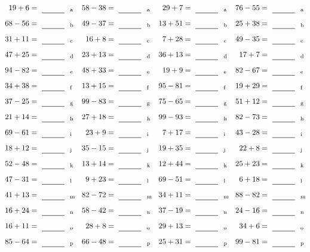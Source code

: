 \documentclass
[
  draft    = true,
  fontsize = 11pt,
  parskip  = half-
]
{scrartcl}
\begin{document}
\clearpage
\begin{align*}
    \pline{19+6}&=\rline{a}
  & \pline{58-38}&=\rline{a}
  & \pline{29+7}&=\rline{a}
  & \pline{76-55}&=\rline{a} \\[1ex]
    \pline{68-56}&=\rline{b}
  & \pline{49-37}&=\rline{b}
  & \pline{13+51}&=\rline{b}
  & \pline{25+38}&=\rline{b} \\[1ex]
    \pline{31+11}&=\rline{c}
  & \pline{16+8}&=\rline{c}
  & \pline{7+28}&=\rline{c}
  & \pline{49-35}&=\rline{c} \\[1ex]
    \pline{47+25}&=\rline{d}
  & \pline{23+13}&=\rline{d}
  & \pline{36+13}&=\rline{d}
  & \pline{17+7}&=\rline{d} \\[1ex]
    \pline{94-82}&=\rline{e}
  & \pline{48+33}&=\rline{e}
  & \pline{19+9}&=\rline{e}
  & \pline{82-67}&=\rline{e} \\[1ex]
    \pline{34+38}&=\rline{f}
  & \pline{13+15}&=\rline{f}
  & \pline{95-81}&=\rline{f}
  & \pline{19+29}&=\rline{f} \\[1ex]
    \pline{37-25}&=\rline{g}
  & \pline{99-83}&=\rline{g}
  & \pline{75-65}&=\rline{g}
  & \pline{51+12}&=\rline{g} \\[1ex]
    \pline{21+14}&=\rline{h}
  & \pline{27+18}&=\rline{h}
  & \pline{99-93}&=\rline{h}
  & \pline{82-73}&=\rline{h} \\[1ex]
    \pline{69-61}&=\rline{i}
  & \pline{23+9}&=\rline{i}
  & \pline{7+17}&=\rline{i}
  & \pline{43-28}&=\rline{i} \\[1ex]
    \pline{18+12}&=\rline{j}
  & \pline{35-15}&=\rline{j}
  & \pline{19+35}&=\rline{j}
  & \pline{22+8}&=\rline{j} \\[1ex]
    \pline{52-48}&=\rline{k}
  & \pline{13+14}&=\rline{k}
  & \pline{12+44}&=\rline{k}
  & \pline{25+23}&=\rline{k} \\[1ex]
    \pline{47-31}&=\rline{l}
  & \pline{9+23}&=\rline{l}
  & \pline{69-51}&=\rline{l}
  & \pline{6+18}&=\rline{l} \\[1ex]
    \pline{41+13}&=\rline{m}
  & \pline{82-72}&=\rline{m}
  & \pline{34+11}&=\rline{m}
  & \pline{88-82}&=\rline{m} \\[1ex]
    \pline{16+24}&=\rline{n}
  & \pline{58-42}&=\rline{n}
  & \pline{37-19}&=\rline{n}
  & \pline{24-16}&=\rline{n} \\[1ex]
    \pline{16+11}&=\rline{o}
  & \pline{28+8}&=\rline{o}
  & \pline{29+13}&=\rline{o}
  & \pline{34+6}&=\rline{o} \\[1ex]
    \pline{85-64}&=\rline{p}
  & \pline{66-48}&=\rline{p}
  & \pline{25+31}&=\rline{p}
  & \pline{99-81}&=\rline{p}
\end{align*}
\end{document}
